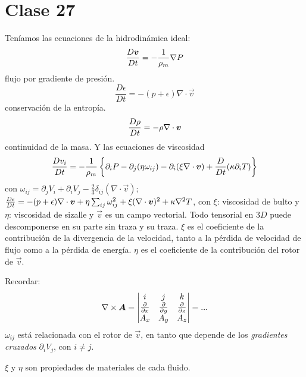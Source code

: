 \section{Clase 27}
Teníamos las ecuaciones de la hidrodinámica ideal:
\begin{equation}
  \frac{D\vb*{v}}{Dt}=-\frac{1}{\rho_m}\nabla P
\end{equation}
flujo por gradiente de presión.
\begin{equation}
  \frac{D\epsilon}{Dt}=-(p+\epsilon)\nabla\cdot\vec{v}
\end{equation}
conservación de la entropía.
\begin{equation}
  \frac{D\rho }{Dt}=-\rho\nabla\cdot\vb*{v}
\end{equation}
continuidad de la masa.
Y las ecuaciones de viscosidad
\begin{equation}
 \frac{D v_i}{Dt}=-\frac{1}{\rho_m}\left\{\partial_iP-\partial_j(\eta\omega_{ij})-\partial_i(\xi \nabla\cdot\vb*{v})+\frac{D}{Dt}(\kappa\partial_i T)\right\}
\end{equation}
con $\omega_{ij}=\partial_jV_i+\partial_iV_j-\frac{2}{3}\delta_{ij}(\nabla\cdot\vec{v})$; $\frac{D\epsilon}{Dt}=-(p+\epsilon)\nabla\cdot\vb*{v}+\eta\sum_{ij}\omega_{ij}^2+\xi (\nabla\cdot\vb*{v})^2+\kappa \nabla^2T$, con $\xi $: viscosidad de bulto y $\eta$: viscosidad de sizalle y $\vec{v	}$ es un campo vectorial. Todo tensorial en $3D$ puede descomponerse en su parte sin traza y su traza. $\xi$ es el coeficiente de la contribución de la divergencia de la velocidad, tanto a la pérdida de velocidad de flujo como a la pérdida de energía. $\eta$ es el coeficiente de la contribución del rotor de $\vec{v}$. 

Recordar:
\begin{equation}
  \nabla\times\vec{A}=\mqty|i&j&k\\\pdv{x}&\pdv{y}&\pdv{z}\\A_x&A_y&A_z|=...
\end{equation}
$\omega_{ij}$ está relacionada con el rotor de $\vec{v}$, en tanto que depende de los \textit{gradientes cruzados} $\partial_iV_j$, con $i\neq j$.

$\xi$ y $\eta$ son propiedades de materiales de cada fluido.

